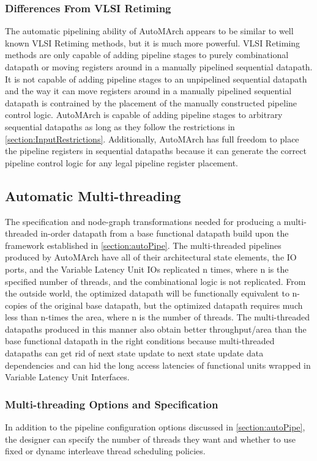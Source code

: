 \subsubsection{Differences From VLSI Retiming}
The automatic pipelining ability of AutoMArch appears to be similar to well known VLSI Retiming methods, but it is much more powerful. VLSI Retiming methods are only capable of adding pipeline stages to purely combinational datapath or moving registers around in a manually pipelined sequential datapath. It is not capable of adding pipeline stages to an unpipelined sequential datapath and the way it can move registers around in a manually pipelined sequential datapath is contrained by the placement of the manually constructed pipeline control logic. AutoMArch is capable of adding pipeline stages to arbitrary sequential datapaths as long as they follow the restrictions in \ref{section:InputRestrictions}. Additionally, AutoMArch has full freedom to place the pipeline registers in sequential datapaths because it can generate the correct pipeline control logic for any legal pipeline register placement.

\subsection{Automatic Multi-threading}
\label{section:autoMult}
The specification and node-graph transformations needed for producing a multi-threaded in-order datapath from a base functional datapath build upon the framework established in \ref{section:autoPipe}. The multi-threaded pipelines produced by AutoMArch have all of their architectural state elements, the IO ports, and the Variable Latency Unit IOs replicated n times, where n is the specified number of threads, and the combinational logic is not replicated. From the outside world, the optimized datapath will be functionally equivalent to n-copies of the original base datapath, but the optimized datapath requires much less than n-times the area, where n is the number of threads. The multi-threaded datapaths produced in this manner also obtain better throughput/area than the base functional datapath in the right conditions because multi-threaded datapaths can get rid of next state update to next state update data dependencies and can hid the long access latencies of functional units wrapped in Variable Latency Unit Interfaces.

\subsubsection{Multi-threading Options and Specification}
In addition to the pipeline configuration options discussed in \ref{section:autoPipe}, the designer can specify the number of threads they want and whether to use fixed or dynamc interleave thread scheduling policies. 

